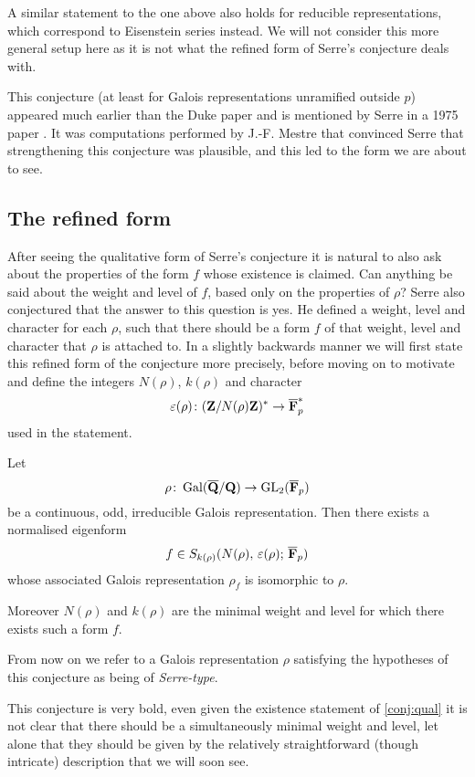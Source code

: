 \documentclass[a4paper,12pt]{article}
\begin{document}
A similar statement to the one above also holds for reducible representations, which correspond to Eisenstein series instead.
We will not consider this more general setup here as it is not what the refined form of Serre's conjecture deals with.

This conjecture (at least for Galois representations unramified outside $p$) appeared much earlier than the Duke paper and is mentioned by Serre in a 1975 paper \cite[sec. 3]{Serre75}.
It was computations performed by J.-F. Mestre that convinced Serre that strengthening this conjecture was plausible, and this led to the form we are about to see.%



\subsection{The refined form}
After seeing the qualitative form of Serre's conjecture it is natural to also ask about the properties of the form $f$ whose existence is claimed.
Can anything be said about the weight and level of $f$, based only on the properties of $\rho$?
Serre also conjectured that the answer to this question is yes.
He defined a weight, level and character for each $\rho$, such that there should be a form $f$ of that weight, level and character that $\rho$ is attached to.
In a slightly backwards manner we will first state this refined form of the conjecture more precisely, before moving on to motivate and define the integers $N(\rho)$, $k(\rho)$ and character
\[
\varepsilon(\rho)\colon (\mathbf{Z}/N(\rho)\mathbf{Z})^* \to \overline{\mathbf{F}}_p^*
\]
used in the statement.

\begin{conjecture}\label{conj:ref}
Let
\[
\rho\colon \operatorname{Gal}(\overline{\mathbf{Q}}/\mathbf{Q}) \to \operatorname{GL}_2(\overline{\mathbf{F}}_p)
\]
be a continuous, odd, irreducible Galois representation.
Then there exists a normalised eigenform
\[
f\in S_{k(\rho)}(N(\rho),\,\varepsilon(\rho);\,\overline{\mathbf{F}}_p)
\]
whose associated Galois representation $\rho_f$ is isomorphic to $\rho$.

Moreover $N(\rho)$ and $k(\rho)$ are the minimal weight and level for which there exists such a form $f$.
\end{conjecture}

From now on we refer to a Galois representation $\rho$ satisfying the hypotheses of this conjecture as being of \emph{Serre-type}.

This conjecture is very bold, even given the existence statement of \cref{conj:qual} it is not clear that there should be a simultaneously minimal weight and level, let alone that they should be given by the relatively straightforward (though intricate) description that we will soon see.
\end{document}
